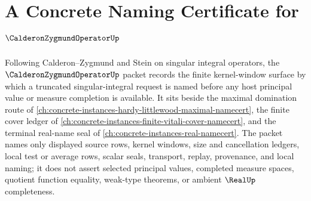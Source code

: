 \chapter{A Concrete Naming Certificate for $\CalderonZygmundOperatorUp$}
\label{ch:concrete-instances-calderon-zygmund-operator-namecert}

Following Calderon--Zygmund and Stein on singular integral operators, the $\CalderonZygmundOperatorUp$ packet records the finite kernel-window surface by which a truncated singular-integral request is named before any host principal value or measure completion is available. It sits beside the maximal domination route of \autoref{ch:concrete-instances-hardy-littlewood-maximal-namecert}, the finite cover ledger of \autoref{ch:concrete-instances-finite-vitali-cover-namecert}, and the terminal real-name seal of \autoref{ch:concrete-instances-real-namecert}. The packet names only displayed source rows, kernel windows, size and cancellation ledgers, local test or average rows, scalar seals, transport, replay, provenance, and local naming; it does not assert selected principal values, completed measure spaces, quotient function equality, weak-type theorems, or ambient $\RealUp$ completeness.

